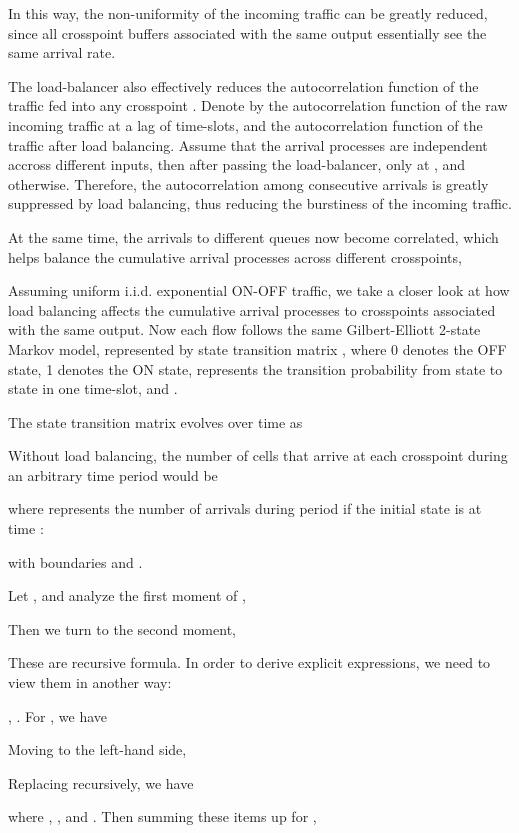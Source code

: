 \documentclass[journal,final,doublecolumn,10pt,twoside]{IEEEtranTCOM} \normalsize
\begin{document}
In this way, the non-uniformity of the incoming traffic can be greatly reduced, since all crosspoint buffers  associated with the same output  essentially see the same arrival rate.

The load-balancer also effectively reduces the autocorrelation function of the traffic fed into any crosspoint . Denote by  the autocorrelation function of the raw incoming traffic at a lag of  time-slots, and  the autocorrelation function of the traffic after load balancing. Assume that the arrival processes are independent accross different inputs, then after passing the load-balancer,  only at , and  otherwise.
Therefore, the autocorrelation among consecutive arrivals is greatly suppressed by load balancing, thus reducing the burstiness of the incoming traffic.

At the same time, the arrivals to different queues now become correlated, which helps balance the cumulative arrival processes across different crosspoints,


Assuming uniform i.i.d. exponential ON-OFF traffic, we take a closer look at how load balancing affects the cumulative arrival processes to crosspoints associated with the same output. Now each flow follows the same Gilbert-Elliott 2-state Markov model, represented by state transition matrix
, where 0 denotes the OFF state, 1 denotes the ON state,  represents the transition probability from state  to state  in one time-slot, and .

The state transition matrix evolves over time as


Without load balancing, the number of cells that arrive at each crosspoint during an arbitrary time period  would be

where  represents the number of arrivals during period  if the initial state is  at time :


with boundaries  and .

Let , and analyze the first moment of ,


 

Then we turn to the second moment,



These are recursive formula. In order to derive explicit expressions, we need to view them in another way:


, . For , we have


Moving  to the left-hand side,


Replacing  recursively, 
we have

where , , and . Then summing these items up for ,
\end{document}
